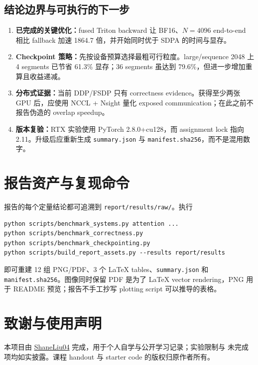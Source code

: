 \documentclass[11pt,a4paper]{ctexart}
\begin{document}
\subsection{结论边界与可执行的下一步}
\begin{enumerate}
  \item \textbf{已完成的关键优化：}fused Triton backward 让 BF16、$N=4096$
  end-to-end 相比 fallback 加速 1864.7 倍，并开始同时优于 SDPA 的时间与显存。
  \item \textbf{Checkpoint 策略：}先按设备预算选择最粗可行粒度。large/sequence 2048
  上 4 segments 已节省 61.3\% 显存；36 segments 虽达到 79.6\%，但进一步增加重算且收益递减。
  \item \textbf{分布式证据：}当前 DDP/FSDP 只有 correctness evidence。获得至少两张 GPU
  后，应使用 NCCL + Nsight 量化 exposed communication；在此之前不报告伪造的 overlap speedup。
  \item \textbf{版本复验：}RTX 实验使用 PyTorch 2.8.0+cu128，而 assignment lock 指向
  2.11。升级后应重新生成 \texttt{summary.json} 与 \texttt{manifest.sha256}，而不是混用数字。
\end{enumerate}

\appendix
\section{报告资产与复现命令}
报告的每个定量结论都可追溯到 \texttt{report/results/raw/}。执行
\begin{lstlisting}
python scripts/benchmark_systems.py attention ...
python scripts/benchmark_correctness.py
python scripts/benchmark_checkpointing.py
python scripts/build_report_assets.py --results report/results
\end{lstlisting}
即可重建 12 组 PNG/PDF、3 个 LaTeX tables、\texttt{summary.json} 和
\texttt{manifest.sha256}。图像同时保留 PDF 是为了 LaTeX vector rendering，PNG
用于 README 预览；报告不手工抄写 plotting script 可以推导的表格。

\section*{致谢与使用声明}
本项目由 \href{https://github.com/ShaneLiu04}{ShaneLiu04} 完成，用于个人自学与公开学习记录；实验限制与
未完成项均如实披露。课程 handout 与 starter code 的版权归原作者所有。
\end{document}
